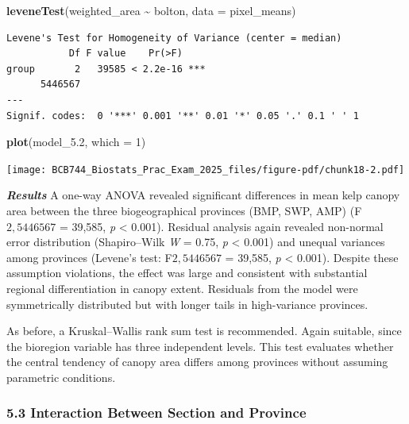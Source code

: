 \documentclass[
  british,
  10pt,
]{article}
\newenvironment{Shaded}{\begin{snugshade}}{\end{snugshade}}
\newcommand{\AttributeTok}[1]{\textcolor[rgb]{0.13,0.29,0.53}{#1}}
\newcommand{\DecValTok}[1]{\textcolor[rgb]{0.00,0.00,0.81}{#1}}
\newcommand{\FloatTok}[1]{\textcolor[rgb]{0.00,0.00,0.81}{#1}}
\newcommand{\FunctionTok}[1]{\textcolor[rgb]{0.13,0.29,0.53}{\textbf{#1}}}
\newcommand{\NormalTok}[1]{#1}
\newcommand{\SpecialCharTok}[1]{\textcolor[rgb]{0.81,0.36,0.00}{\textbf{#1}}}
\let\oldtexttt\texttt
\renewcommand{\texttt}[1]{\oldtexttt{\small #1}}
\begin{document}
\begin{Shaded}
\begin{Highlighting}[]
\FunctionTok{leveneTest}\NormalTok{(weighted\_area }\SpecialCharTok{\textasciitilde{}}\NormalTok{ bolton, }\AttributeTok{data =}\NormalTok{ pixel\_means)}
\end{Highlighting}
\end{Shaded}

\begin{verbatim}
Levene's Test for Homogeneity of Variance (center = median)
           Df F value    Pr(>F)    
group       2   39585 < 2.2e-16 ***
      5446567                      
---
Signif. codes:  0 '***' 0.001 '**' 0.01 '*' 0.05 '.' 0.1 ' ' 1
\end{verbatim}

\begin{Shaded}
\begin{Highlighting}[]
\FunctionTok{plot}\NormalTok{(model\_5}\FloatTok{.2}\NormalTok{, }\AttributeTok{which =} \DecValTok{1}\NormalTok{)}
\end{Highlighting}
\end{Shaded}

\begin{center}
\texttt{[image: BCB744\_Biostats\_Prac\_Exam\_2025\_files/figure-pdf/chunk18-2.pdf]}
\end{center}

\textbf{\emph{Results}} A one-way ANOVA revealed significant differences
in mean kelp canopy area between the three biogeographical provinces
(BMP, SWP, AMP) (F\({2,5446567}\) = 39,585, \emph{p} \textless{} 0.001).
Residual analysis again revealed non-normal error distribution
(Shapiro--Wilk \emph{W} = 0.75, \emph{p} \textless{} 0.001) and unequal
variances among provinces (Levene's test: F\({2,5446567}\) = 39,585,
\emph{p} \textless{} 0.001). Despite these assumption violations, the
effect was large and consistent with substantial regional
differentiation in canopy extent. Residuals from the model were
symmetrically distributed but with longer tails in high-variance
provinces.

As before, a Kruskal--Wallis rank sum test is recommended. Again
suitable, since the bioregion variable has three independent levels.
This test evaluates whether the central tendency of canopy area differs
among provinces without assuming parametric conditions.

\subsubsection{5.3 Interaction Between Section and
Province}\label{interaction-between-section-and-province}
\end{document}

